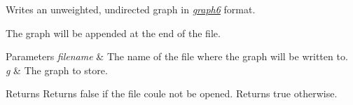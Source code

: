 Writes an unweighted, undirected graph in {\itshape \hyperlink{namespacelgraph_1_1io_1_1graph6}{graph6}} format. 

The graph will be appended at the end of the file. 
\begin{DoxyParams}{Parameters}
{\em filename} & The name of the file where the graph will be written to. \\
\hline
{\em g} & The graph to store. \\
\hline
\end{DoxyParams}
\begin{DoxyReturn}{Returns}
Returns false if the file coule not be opened. Returns true otherwise. 
\end{DoxyReturn}
